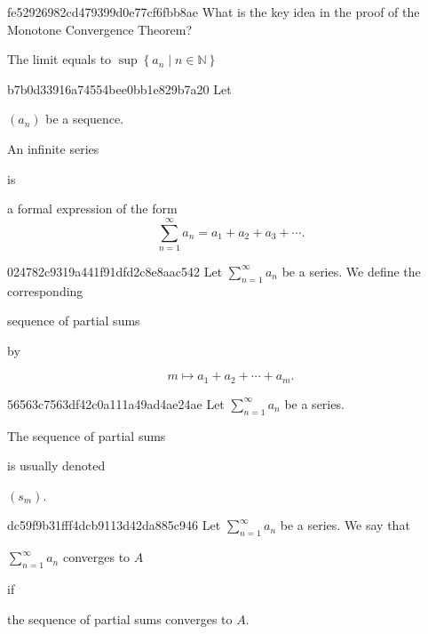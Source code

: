 \begin{note}{fe52926982cd479399d0e77cf6fbb8ae}
    What is the key idea in the proof of the Monotone Convergence Theorem?

    \begin{cloze}{1}
        The limit equals to \({ \sup \left\{ a_n \mid n \in \mathbb N \right\} }\)
    \end{cloze}
\end{note}

\begin{note}{b7b0d33916a74554bee0bb1e829b7a20}
    Let \begin{icloze}{3}\({ (a_n) }\) be a sequence.\end{icloze}
    \begin{icloze}{2}An infinite series\end{icloze} is
    \begin{icloze}{1}
        a formal expression of the form
        \[
            \sum_{n=1}^{\infty} a_n = a_1 + a_2 + a_3 + \cdots.
        \]
    \end{icloze}
\end{note}

\begin{note}{024782c9319a441f91dfd2c8e8aac542}
    Let \({ \sum_{n=1}^{\infty} a_n }\) be a series.
    We define the corresponding \begin{icloze}{2}sequence of partial sums\end{icloze} by
    \begin{icloze}{1}
        \[
            m \mapsto a_1 + a_2 + \cdots + a_m.
        \]
    \end{icloze}
\end{note}

\begin{note}{56563c7563df42c0a111a49ad4ae24ae}
    Let \({ \sum_{n=1}^{\infty} a_n }\) be a series.
    \begin{icloze}{2}The sequence of partial sums\end{icloze} is usually denoted \begin{icloze}{1}\({ (s_m) }\).\end{icloze}
\end{note}

\begin{note}{dc59f9b31fff4dcb9113d42da885c946}
    Let \({ \sum_{n=1}^{\infty} a_n }\) be a series.
    We say that \begin{icloze}{2}\({ \sum_{n=1}^{\infty} a_n }\) converges to \({ A }\)\end{icloze} if \begin{icloze}{1}the sequence of partial sums converges to \({ A }\).\end{icloze}
\end{note}

